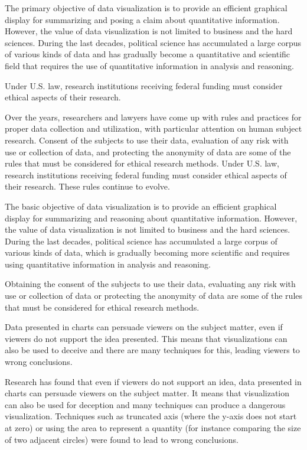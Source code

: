 \documentclass[]{book}
\theoremstyle{definition}
\theoremstyle{definition}
\theoremstyle{definition}
\theoremstyle{remark}
\begin{document}
The primary objective of data visualization is to provide an efficient
graphical display for summarizing and posing a claim about quantitative
information. However, the value of data visualization is not limited to
business and the hard sciences. During the last decades, political
science has accumulated a large corpus of various kinds of data and has
gradually become a quantitative and scientific field that requires the
use of quantitative information in analysis and reasoning.

Under U.S. law, research institutions receiving federal funding must
consider ethical aspects of their research.

Over the years, researchers and lawyers have come up with rules and
practices for proper data collection and utilization, with particular
attention on human subject research. Consent of the subjects to use
their data, evaluation of any risk with use or collection of data, and
protecting the anonymity of data are some of the rules that must be
considered for ethical research methods. Under U.S. law, research
institutions receiving federal funding must consider ethical aspects of
their research. These rules continue to evolve.

The basic objective of data visualization is to provide an efficient
graphical display for summarizing and reasoning about quantitative
information. However, the value of data visualization is not limited to
business and the hard sciences. During the last decades, political
science has accumulated a large corpus of various kinds of data, which
is gradually becoming more scientific and requires using quantitative
information in analysis and reasoning.

Obtaining the consent of the subjects to use their data, evaluating any
risk with use or collection of data or protecting the anonymity of data
are some of the rules that must be considered for ethical research
methods.

Data presented in charts can persuade viewers on the subject matter,
even if viewers do not support the idea presented. This means that
visualizations can also be used to deceive and there are many techniques
for this, leading viewers to wrong conclusions.

Research has found that even if viewers do not support an idea, data
presented in charts can persuade viewers on the subject matter. It means
that visualization can also be used for deception and many techniques
can produce a dangerous visualization. Techniques such as truncated axis
(where the y-axis does not start at zero) or using the area to represent
a quantity (for instance comparing the size of two adjacent circles)
were found to lead to wrong conclusions.
\end{document}
